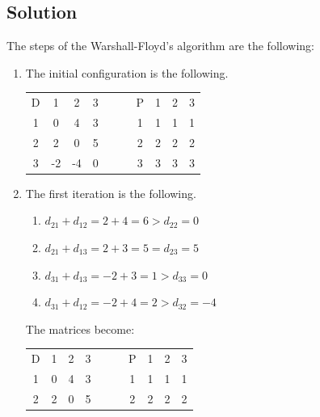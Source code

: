 \documentclass[12pt, a4paper]{report}
\begin{document}
    \subsection*{Solution}
        The steps of the Warshall-Floyd's algorithm are the following:
        \begin{enumerate}
            \item The initial configuration is the following. 
                \begin{table}[H]
                    \centering
                    \begin{tabular}{c|ccccc|ccc}
                    D & 1        & 2        & 3          & $\:\:\:\:\:\:$ & P & 1 & 2 & 3  \\ \cline{1-4} \cline{6-9} 
                    1 & 0        & 4        & 3          &                & 1 & 1 & 1 & 1  \\
                    2 & 2        & 0        & 5          &                & 2 & 2 & 2 & 2  \\
                    3 & -2       & -4       & 0          &                & 3 & 3 & 3 & 3  \\ 
                    \end{tabular}
                \end{table}
            \item The first iteration is the following. 
                \begin{enumerate}
                    \item $d_{21} + d_{12} = 2 + 4 = 6 > d_{22} = 0$
                    \item $d_{21} + d_{13} = 2 + 3 = 5 = d_{23} = 5$
                    \item $d_{31} + d_{13} = -2 + 3 = 1 > d_{33} = 0$
                    \item $d_{31} + d_{12} = -2 + 4 = 2 > d_{32} = -4$
                \end{enumerate}
                The matrices become: 
                \begin{table}[H]
                    \centering
                    \begin{tabular}{c|ccccc|ccc}
                    D & 1        & 2        & 3          & $\:\:\:\:\:\:$ & P & 1 & 2 & 3  \\ \cline{1-4} \cline{6-9} 
                    1 & 0        & 4        & 3          &                & 1 & 1 & 1 & 1  \\
                    2 & 2        & 0        & 5          &                & 2 & 2 & 2 & 2  \\

\end{tabular}
\end{table}
\end{enumerate}
\end{document}
